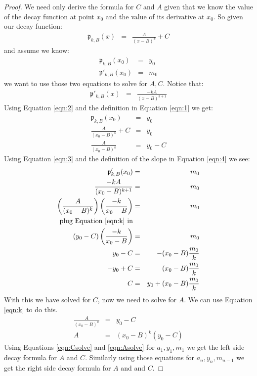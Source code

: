 \documentclass[10pt]{article}
\begin{document}
\begin{proof}
We need only derive the formula for $C$ and $A$ given that we know the value
of the decay function at point $x_0$ and the value of its derivative
at $x_0$.  So given our decay function:
\begin{eqnarray}
\label{eqn:1}
\mathfrak{p}_{k,B}(x)&=&\frac{A}{(x-B)^k} + C
\end{eqnarray}
and assume we know:
\begin{eqnarray}
\label{eqn:2}\mathfrak{p}_{k,B}(x_0)&=&y_0 \\
\label{eqn:3}\mathfrak{p}'_{k,B}(x_0)&=&m_0
\end{eqnarray}
we want to use those two equations to solve for $A, C$. Notice that:
\begin{eqnarray}
\label{eqn:4}\mathfrak{p}'_{k,B}(x) &=& \frac{-kA}{(x-B)^{k+1}}
\end{eqnarray}
Using Equation \ref{eqn:2} and the definition in Equation \ref{eqn:1} we get:
\begin{eqnarray}
\mathfrak{p}_{k,B}(x_0)&=&y_0 \\
\frac{A}{(x_0-B)^k} +C &=& y_0 \\ \label{eqn:k}
\frac{A}{(x_0-B)^k} &=& y_0 - C
\end{eqnarray}
Using Equation \ref{eqn:3} and the definition of the slope in Equation
\ref{eqn:4} we see:
\begin{eqnarray}
\mathfrak{p}'_{k,B}(x_0)&=&m_0 \\
\frac{-kA}{(x_0-B)^{k+1}}&=&m_0 \\
\left(\frac{A}{(x_0-B)^{k}}\right) \left( \frac{-k}{x_0-B} \right) &=&m_0 \\
\hbox{plug Equation \ref{eqn:k} in} \\
\left(y_0-C\right)\left( \frac{-k}{x_0-B} \right) &=& m_0 \\
y_0-C &=& -(x_0-B)\frac{m_0}{k} \\
-y_0+C &=&(x_0-B)\frac{m_0}{k} \\
\label{eqn:Csolve} C &=& y_0+(x_0-B)\frac{m_0}{k}
\end{eqnarray}
With this we have solved for $C$, now we need to solve for $A$.  We can use
Equation \ref{eqn:k} to do this.
\begin{eqnarray}
\frac{A}{(x_0-B)^k} &=& y_0 - C \\
\label{eqn:Asolve} A &=& (x_0-B)^k(y_0-C)
\end{eqnarray}
Using Equations \ref{eqn:Csolve} and \ref{eqn:Asolve} for $a_1, y_1, m_1$ we
get the left side decay formula for $A$ and $C$.  Similarly using those equations for
$a_n, y_n, m_{n-1}$ we get the right side decay formula for $A$ and and $C$.
\end{proof}
\end{document}
